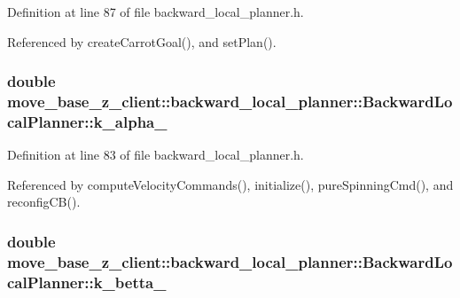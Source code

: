 Definition at line 87 of file backward\+\_\+local\+\_\+planner.\+h.



Referenced by create\+Carrot\+Goal(), and set\+Plan().

\subsubsection[{\texorpdfstring{k\+\_\+alpha\+\_\+}{k_alpha_}}]{\setlength{\rightskip}{0pt plus 5cm}double move\+\_\+base\+\_\+z\+\_\+client\+::backward\+\_\+local\+\_\+planner\+::\+Backward\+Local\+Planner\+::k\+\_\+alpha\+\_\+\hspace{0.3cm}{\ttfamily [private]}}\hypertarget{classmove__base__z__client_1_1backward__local__planner_1_1BackwardLocalPlanner_ac859500c0329247de08daf864fd2d4b1}{}\label{classmove__base__z__client_1_1backward__local__planner_1_1BackwardLocalPlanner_ac859500c0329247de08daf864fd2d4b1}


Definition at line 83 of file backward\+\_\+local\+\_\+planner.\+h.



Referenced by compute\+Velocity\+Commands(), initialize(), pure\+Spinning\+Cmd(), and reconfig\+C\+B().

\subsubsection[{\texorpdfstring{k\+\_\+betta\+\_\+}{k_betta_}}]{\setlength{\rightskip}{0pt plus 5cm}double move\+\_\+base\+\_\+z\+\_\+client\+::backward\+\_\+local\+\_\+planner\+::\+Backward\+Local\+Planner\+::k\+\_\+betta\+\_\+\hspace{0.3cm}{\ttfamily [private]}}\hypertarget{classmove__base__z__client_1_1backward__local__planner_1_1BackwardLocalPlanner_aa2f7fe022cdc4eb11c17f6f576c732c6}{}\label{classmove__base__z__client_1_1backward__local__planner_1_1BackwardLocalPlanner_aa2f7fe022cdc4eb11c17f6f576c732c6}


